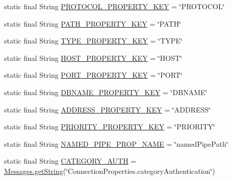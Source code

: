 \begin{DoxyCompactItemize}
\item 
static final String \mbox{\hyperlink{classcom_1_1mysql_1_1cj_1_1conf_1_1_property_definitions_ade155de50dcfc803641118d79a9ea9ff}{P\+R\+O\+T\+O\+C\+O\+L\+\_\+\+P\+R\+O\+P\+E\+R\+T\+Y\+\_\+\+K\+EY}} = \char`\"{}P\+R\+O\+T\+O\+C\+OL\char`\"{}
\item 
static final String \mbox{\hyperlink{classcom_1_1mysql_1_1cj_1_1conf_1_1_property_definitions_a15ada3c5b5211c8a7a37ed2b902defb4}{P\+A\+T\+H\+\_\+\+P\+R\+O\+P\+E\+R\+T\+Y\+\_\+\+K\+EY}} = \char`\"{}P\+A\+TH\char`\"{}
\item 
static final String \mbox{\hyperlink{classcom_1_1mysql_1_1cj_1_1conf_1_1_property_definitions_a8ac22af66f603b347a16813ea40c6709}{T\+Y\+P\+E\+\_\+\+P\+R\+O\+P\+E\+R\+T\+Y\+\_\+\+K\+EY}} = \char`\"{}T\+Y\+PE\char`\"{}
\item 
static final String \mbox{\hyperlink{classcom_1_1mysql_1_1cj_1_1conf_1_1_property_definitions_ada7cce64613fdd2ca055b77dfea2bc2b}{H\+O\+S\+T\+\_\+\+P\+R\+O\+P\+E\+R\+T\+Y\+\_\+\+K\+EY}} = \char`\"{}H\+O\+ST\char`\"{}
\item 
static final String \mbox{\hyperlink{classcom_1_1mysql_1_1cj_1_1conf_1_1_property_definitions_aa7ba552144b34b255e0687c1a8e764b0}{P\+O\+R\+T\+\_\+\+P\+R\+O\+P\+E\+R\+T\+Y\+\_\+\+K\+EY}} = \char`\"{}P\+O\+RT\char`\"{}
\item 
static final String \mbox{\hyperlink{classcom_1_1mysql_1_1cj_1_1conf_1_1_property_definitions_adc14d00146a8f70223433d0626a98352}{D\+B\+N\+A\+M\+E\+\_\+\+P\+R\+O\+P\+E\+R\+T\+Y\+\_\+\+K\+EY}} = \char`\"{}D\+B\+N\+A\+ME\char`\"{}
\item 
static final String \mbox{\hyperlink{classcom_1_1mysql_1_1cj_1_1conf_1_1_property_definitions_a253d8f60b8eea25d3c4ffab8f999c7c2}{A\+D\+D\+R\+E\+S\+S\+\_\+\+P\+R\+O\+P\+E\+R\+T\+Y\+\_\+\+K\+EY}} = \char`\"{}A\+D\+D\+R\+E\+SS\char`\"{}
\item 
static final String \mbox{\hyperlink{classcom_1_1mysql_1_1cj_1_1conf_1_1_property_definitions_a277a938c14096b7dc5eda6874029a839}{P\+R\+I\+O\+R\+I\+T\+Y\+\_\+\+P\+R\+O\+P\+E\+R\+T\+Y\+\_\+\+K\+EY}} = \char`\"{}P\+R\+I\+O\+R\+I\+TY\char`\"{}
\item 
static final String \mbox{\hyperlink{classcom_1_1mysql_1_1cj_1_1conf_1_1_property_definitions_ad03d85afee4096d1aeb0bde451700aaa}{N\+A\+M\+E\+D\+\_\+\+P\+I\+P\+E\+\_\+\+P\+R\+O\+P\+\_\+\+N\+A\+ME}} = \char`\"{}named\+Pipe\+Path\char`\"{}
\item 
static final String \mbox{\hyperlink{classcom_1_1mysql_1_1cj_1_1conf_1_1_property_definitions_ac7d239a3596b6002d5746399ee38a49b}{C\+A\+T\+E\+G\+O\+R\+Y\+\_\+\+A\+U\+TH}} = \mbox{\hyperlink{classcom_1_1mysql_1_1cj_1_1_messages_a86a388448aa7759254c491b3e1320d31}{Messages.\+get\+String}}(\char`\"{}Connection\+Properties.\+category\+Authentication\char`\"{})

\end{DoxyCompactItemize}
